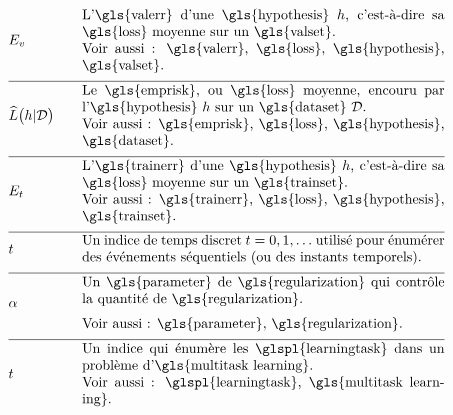\begin{align}
	& \valerror & \quad & \parbox{.75\textwidth}{L'\gls{valerr} d’une \gls{hypothesis} $\hypothesis$, c’est-à-dire sa \gls{loss} moyenne sur un \gls{valset}. \\ Voir aussi : \gls{valerr}, \gls{loss}, \gls{hypothesis}, \gls{valset}.} \nonumber \\[2mm] \hline \nonumber\\[-5mm]
	& \emperror\big(\hypothesis| \dataset \big) & \quad & \parbox{.75\textwidth}{Le \gls{emprisk}, ou \gls{loss} moyenne, encouru par l'\gls{hypothesis} $\hypothesis$ sur un \gls{dataset} $\dataset$. \\ Voir aussi : \gls{emprisk}, \gls{loss}, \gls{hypothesis}, \gls{dataset}.} \nonumber \\[2mm] \hline \nonumber\\[-5mm]
	& \trainerror & \quad & \parbox{.75\textwidth}{L’\gls{trainerr} d’une \gls{hypothesis} $\hypothesis$, c’est-à-dire sa \gls{loss} moyenne sur un \gls{trainset}. \\ Voir aussi : \gls{trainerr}, \gls{loss}, \gls{hypothesis}, \gls{trainset}.} \nonumber \\[2mm] \hline \nonumber\\[-5mm]
	& \timeidx & \quad & \parbox{.75\textwidth}{Un indice de temps discret $\timeidx=0,1,\ldots$ utilisé pour énumérer des événements séquentiels (ou des instants temporels).} \nonumber \\[2mm] \hline \nonumber\\[-5mm]
	& \regparam & \quad & \parbox{.75\textwidth}{
	Un \gls{parameter} de \gls{regularization} qui contrôle la quantité de \gls{regularization}. \\
	[2mm] Voir aussi : \gls{parameter}, \gls{regularization}.
	} \nonumber \\[2mm] \hline \nonumber\\[-5mm]
	& \taskidx & \quad & \parbox{.75\textwidth}{Un indice qui énumère les \glspl{learningtask} dans un problème d'\gls{multitask learning}. \\ Voir aussi : \glspl{learningtask}, \gls{multitask learning}.} \nonumber
\end{align}


